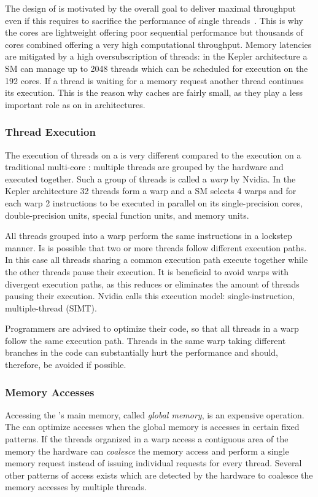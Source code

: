 The design of \GPUs is motivated by the overall goal to deliver maximal throughput even if this requires to sacrifice the performance of single threads~\cite{GarlandK10}.
This is why the \GPU cores are lightweight offering poor sequential performance but thousands of cores combined offering a very high computational throughput.
Memory latencies are mitigated by a high oversubscription of threads:
in the Kepler architecture a SM can manage up to 2048 threads which can be scheduled for execution on the 192 cores.
If a thread is waiting for a memory request another thread continues its execution.
This is the reason why caches are fairly small, as they play a less important role as on in \CPU architectures.

\subsubsection*{\GPU Thread Execution}
The execution of threads on a \GPU is very different compared to the execution on a traditional multi-core \CPU:
multiple threads are grouped by the hardware and executed together.
Such a group of threads is called a \emph{warp} by Nvidia.
In the Kepler architecture 32 threads form a warp and a SM selects 4 warps and for each warp 2 instructions to be executed in parallel on its single-precision cores, double-precision units, special function units, and memory units.

All threads grouped into a warp perform the same instructions in a lockstep manner.
Is is possible that two or more threads follow different execution paths.
In this case all threads sharing a common execution path execute together while the other threads pause their execution.
It is beneficial to avoid warps with divergent execution paths, as this reduces or eliminates the amount of threads pausing their execution.
Nvidia calls this execution model: single-instruction, multiple-thread (SIMT).

Programmers are advised to optimize their code, so that all threads in a warp follow the same execution path.
Threads in the same warp taking different branches in the code can substantially hurt the performance and should, therefore, be avoided if possible.

\subsubsection*{\GPU Memory Accesses}
Accessing the \GPU's main memory, called \emph{global memory}, is an expensive operation.
The \GPU can optimize accesses when the global memory is accesses in certain fixed patterns.
If the threads organized in a warp access a contiguous area of the memory the hardware can \emph{coalesce} the memory access and perform a single memory request instead of issuing individual requests for every thread.
Several other patterns of access exists which are detected by the hardware to coalesce the memory accesses by multiple threads.

